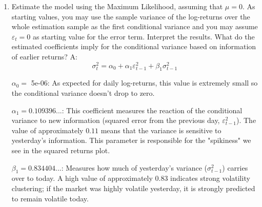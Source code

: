 \documentclass{article}
\begin{document}
\begin{enumerate}
    \item [(c)] Estimate the model using the Maximum Likelihood, assuming that $\mu = 0$. As starting values, you may use the sample variance of the log-returns over the whole estimation sample as the first conditional variance and you may assume $\varepsilon_t = 0$ as starting value for the error term. Interpret the results. What do the estimated coefficients imply for the conditional variance based on information of earlier returns? \newline \newline
    A:$$\sigma_t^2 = \alpha_0 + \alpha_1 \varepsilon_{t-1}^2 + \beta_1 \sigma_{t-1}^2$$
    
    $\alpha_0 =$ 5e-06: As expected for daily log-returns, this value is extremely small so the conditional variance doesn't drop to zero. 
    
    $\alpha_1 = 0.109396...$: This coefficient measures the reaction of the conditional variance to new information (squared error from the previous day, $\varepsilon_{t-1}^2$). The value of approximately $0.11$ means that the variance is sensitive to yesterday's information. This parameter is responsible for the "spikiness" we see in the squared returns plot. 
    
    $\beta_1 = 0.834404...$: Measures how much of yesterday's variance ($\sigma_{t-1}^2$) carries over to today. A high value of approximately $0.83$ indicates strong volatility clustering; if the market was highly volatile yesterday, it is strongly predicted to remain volatile today.
    

\end{enumerate}
\end{document}
